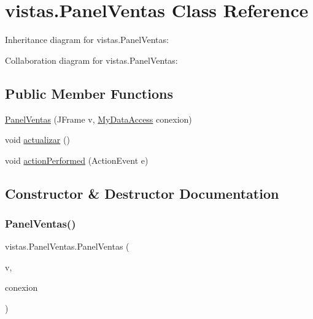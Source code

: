 \hypertarget{classvistas_1_1_panel_ventas}{}\section{vistas.\+Panel\+Ventas Class Reference}
\label{classvistas_1_1_panel_ventas}


Inheritance diagram for vistas.\+Panel\+Ventas\+:


Collaboration diagram for vistas.\+Panel\+Ventas\+:
\subsection*{Public Member Functions}
\begin{DoxyCompactItemize}
\item 
\mbox{\hyperlink{classvistas_1_1_panel_ventas_a5d1bdf141c04ad2c30950b7fc46a445d}{Panel\+Ventas}} (J\+Frame v, \mbox{\hyperlink{classconexion_s_q_l_1_1_my_data_access}{My\+Data\+Access}} conexion)
\item 
void \mbox{\hyperlink{classvistas_1_1_panel_ventas_ab927e7c1043fcaa7ab00e7ac6514e3da}{actualizar}} ()
\item 
void \mbox{\hyperlink{classvistas_1_1_panel_ventas_a4265266a054c7b38d50b30e754a548b6}{action\+Performed}} (Action\+Event e)
\end{DoxyCompactItemize}


\subsection{Constructor \& Destructor Documentation}
\mbox{\label{classvistas_1_1_panel_ventas_a5d1bdf141c04ad2c30950b7fc46a445d}} 
\subsubsection{\texorpdfstring{Panel\+Ventas()}{PanelVentas()}}
{\footnotesize\ttfamily vistas.\+Panel\+Ventas.\+Panel\+Ventas (\begin{DoxyParamCaption}\item[{J\+Frame}]{v,  }\item[{\mbox{\hyperlink{classconexion_s_q_l_1_1_my_data_access}{My\+Data\+Access}}}]{conexion }\end{DoxyParamCaption})\hspace{0.3cm}{\ttfamily [inline]}}

